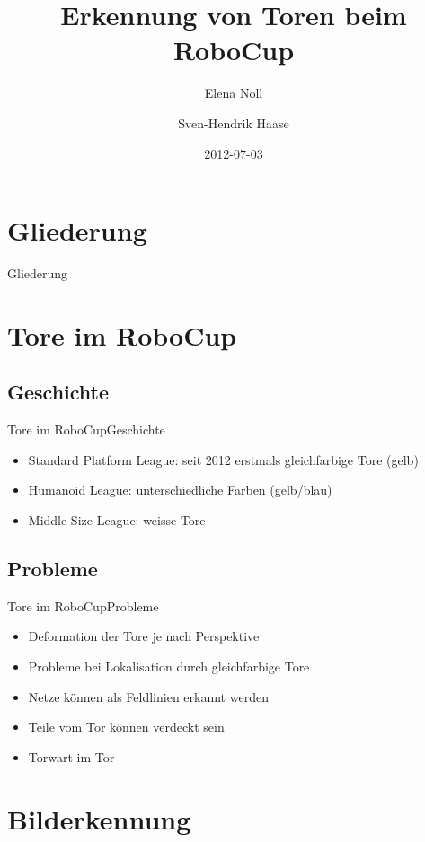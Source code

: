 \documentclass{beamer}
\begin{document}
\title{Erkennung von Toren beim RoboCup}
\date{2012-07-03}
\author{Elena Noll \and Sven-Hendrik Haase}

\begin{frame}
    \titlepage
\end{frame}

\section*{Gliederung}
\begin{frame}{Gliederung}
    \tableofcontents
\end{frame}

\section{Tore im RoboCup}
\subsection{Geschichte}
\begin{frame}{Tore im RoboCup}{Geschichte}
\begin{itemize}
    \item Standard Platform League: seit 2012 erstmals gleichfarbige Tore (gelb)
    \item Humanoid League: unterschiedliche Farben (gelb/blau)
    \item Middle Size League: weisse Tore
\end{itemize}
\end{frame}

\subsection{Probleme}
\begin{frame}{Tore im RoboCup}{Probleme}
\begin{itemize}
    \item Deformation der Tore je nach Perspektive
    \item Probleme bei Lokalisation durch gleichfarbige Tore
    \item Netze können als Feldlinien erkannt werden
    \item Teile vom Tor können verdeckt sein
    \item Torwart im Tor
\end{itemize}
\end{frame}

\section{Bilderkennung}
\end{document}
